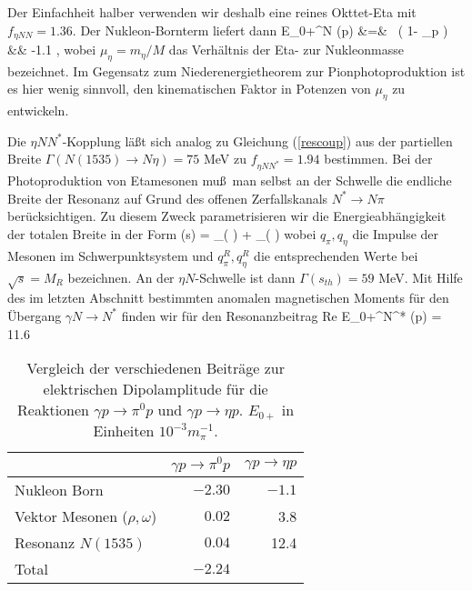 Der Einfachheit halber verwenden wir deshalb eine reines Okttet-Eta mit 
$f_{\eta NN}=1.36$. Der Nukleon-Bornterm liefert dann
\beq
 E_{0+}^N (\eta p) &=&  
   \, \left( 1-
   \kappa_p \right) \\[0.2cm]
   &\simeq& \mbox{} -1.1 \su , \nonumber 
\eeq     
wobei $\mu_\eta=m_\eta/M$ das Verh\"altnis der Eta- zur Nukleonmasse
bezeichnet. Im Gegensatz zum Niederenergietheorem zur 
Pionphotoproduktion ist es hier wenig sinnvoll, den kinematischen 
Faktor in Potenzen von $\mu_\eta$ zu entwickeln. 
 
Die $\eta NN^{*}$-Kopplung l\"a\ss t sich analog zu Gleichung (\ref{rescoup})
aus der partiellen Breite $\Gamma (N(1535)\to N\eta)=75$ MeV
zu $f_{\eta NN^{*}}=1.94$ bestimmen. Bei der Photoproduktion von 
Etamesonen mu\ss\ man selbst an der Schwelle die endliche Breite der
Resonanz auf Grund des offenen Zerfallskanals $N^{*}\to N\pi$
ber\"ucksichtigen. Zu diesem Zweck  parametrisieren wir die 
Energieabh\"angigkeit der totalen Breite in der Form
\be
 \Gamma (s) = \Gamma_\pi \left( \right)
   + \Gamma_\eta \left(  \right) 
\ee
wobei $q_\pi,q_\eta$ die Impulse der Mesonen im Schwerpunktsystem
und $q_\pi^R,q_\eta^R$ die entsprechenden Werte bei $\sqrt{s}=M_R$
bezeichnen. An der $\eta N$-Schwelle ist dann $\Gamma (s_{th})=59$
MeV. Mit Hilfe des im letzten Abschnitt bestimmten anomalen magnetischen
Moments f\"ur den \"Ubergang $\gamma N \to N^{*}$ finden wir
f\"ur den Resonanzbeitrag
\be
  {\rm Re} E_{0+}^{N^{*}} (\eta p) = 11.6  \su
\ee
\begin{table}
\caption{Vergleich der verschiedenen Beitr\"age zur elektrischen
Dipolamplitude f\"ur die Reaktionen $\gamma p \to \pi^0 p$ und 
$\gamma p \to \eta p$. $E_{0+}$ in Einheiten $10^{-3} m_\pi^{-1}$.}
\begin{center}
\begin{tabular}{|l||r|r|}\hline
               & $\gamma p\to \pi^0 p$  &  $\gamma p\to \eta p$ \\ \hline\hline
 Nukleon Born  & $ -2.30$                &   $ -1.1$              \\
 Vektor Mesonen ($\rho,\omega$) & $0.02$  &  3.8	         \\
 Resonanz $N(1535)$             & $0.04$  &  12.4                \\
 Total                          & $-2.24$ &                      \\ \hline
\end{tabular}
\end{center}    
\end{table}
